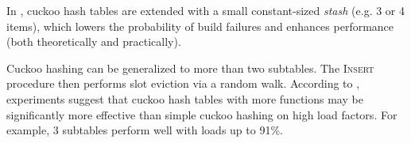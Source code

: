 In \cite{kirsch2009more}, cuckoo hash tables are extended with a small
constant-sized \emph{stash} (e.g. 3 or 4 items), which lowers the probability
of build failures and enhances performance (both theoretically and practically).

Cuckoo hashing can be generalized to more than two subtables.
The \textsc{Insert} procedure then performs slot eviction via a random walk.
According to \cite{open-questions-cuckoo}, experiments suggest that cuckoo
hash tables with more functions may be significantly more effective than simple
cuckoo hashing on high load factors. For example, 3 subtables perform well
with loads up to 91\%.
